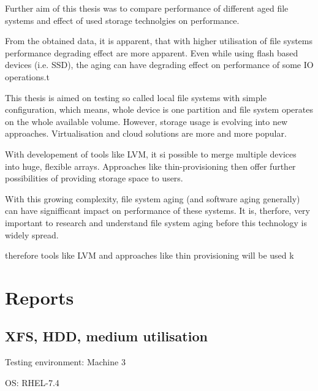 \documentclass[
  color, %
  table, %
  lof,   %
  lot,   %
]{fithesis3}
\begin{document}
Further aim of this thesis was to compare performance of different aged file systems and effect of used storage technolgies on performance. 

From the obtained data, it is apparent, that with higher utilisation of file systems performance degrading effect are more apparent. Even while using flash based devices (i.e. SSD), the aging can have degrading effect on performance of some IO operations.t

This thesis is aimed on testing so called local file systems with simple configuration, which means, whole device is one partition and file system operates on the whole available volume. However, storage usage is evolving into new approaches. Virtualisation and cloud solutions are more and more popular.

With developement of tools like LVM, it si possible to merge multiple devices into huge, flexible arrays. Approaches like thin-provisioning then offer further possibilities of providing storage space to users.



With this growing complexity, file system aging (and software aging generally) can have signifficant impact on performance of these systems. It is, therfore, very important to research and understand file system aging before this technology is widely spread.


therefore tools like LVM and approaches like thin provisioning will be used k















\printbibliography[heading=bibintoc]

\appendix %
\chapter{Reports}\label{reports}
\section{XFS, HDD, medium utilisation}

\begin{compactenum}
  \item Testing environment: Machine 3
  \item OS: RHEL-7.4 
  \end{compactenum}
\end{document}

